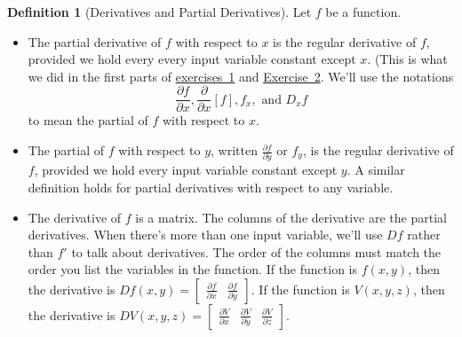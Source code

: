 \documentclass[10pt,]{book}
\theoremstyle{plain}
\theoremstyle{definition}
\newtheorem{definition}[theorem]{Definition}
\theoremstyle{definition}
\theoremstyle{definition}
\theoremstyle{definition}
\theoremstyle{definition}
\numberwithin{equation}{section}
\newcommand{\ds}{\displaystyle}
\newcommand{\amp}{&}
\begin{document}
%
\begin{definition}[{Derivatives and Partial Derivatives}]\label{definition-23}
Let \(f\) be a function. \leavevmode%
\begin{itemize}[label=\textbullet]
\item{}The partial derivative of \(f\) with respect to \(x\) is the regular derivative of \(f\), provided we hold every every input variable constant except \(x\). (This is what we did in the first parts of \hyperref[prob_differential_volume_of_a_cylinder]{exercises~1} and \hyperref[prob_volumebox]{Exercise~2}.  We'll use the notations%
\begin{equation*}
\frac{\partial f}{\partial x}, 
\frac{\partial}{\partial x}[f],
f_x,
\text{ and } D_x f
\end{equation*}
to mean the partial of \(f\) with respect to \(x\).%
\item{}The partial of \(f\) with respect to \(y\), written \(\ds \frac{\partial f}{\partial y}\) or \(f_y\), is the regular derivative of \(f\), provided we hold every input variable constant except \(y\). A similar definition holds for partial derivatives with respect to any variable.%
\item{}The derivative of \(f\) is a matrix. The columns of the derivative are the partial derivatives. When there's more than one input variable, we'll use \(Df\) rather than \(f'\) to talk about derivatives.  The order of the columns must match the order you list the variables in the function. If the function is \(f(x,y)\), then the derivative is \(Df(x,y) = \begin{bmatrix}\frac{\partial f}{\partial x}\amp \frac{\partial f}{\partial y}
\end{bmatrix} .\) If the function is \(V(x,y,z)\), then the derivative is \(DV(x,y,z) = \begin{bmatrix}\frac{\partial V}{\partial x}\amp \frac{\partial V}{\partial y}\amp \frac{\partial V}{\partial z}
\end{bmatrix} .\)%
\end{itemize}
%
\end{definition}
\typeout{************************************************}
\typeout{************************************************}
\end{document}
